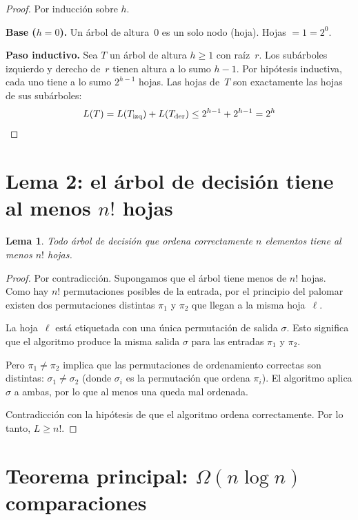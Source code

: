 \documentclass[11pt, letterpaper]{article}
\theoremstyle{definition}
\theoremstyle{plain}
\newtheorem{lemma}[theorem]{Lema}
\theoremstyle{remark}
\begin{document}
\begin{proof}
Por inducción sobre $h$.

\textbf{Base ($h = 0$).} Un árbol de altura~0 es un solo nodo (hoja).
Hojas $= 1 = 2^0$. \checkmark

\textbf{Paso inductivo.} Sea $T$ un árbol de altura $h \geq 1$ con
raíz~$r$. Los subárboles izquierdo y derecho de~$r$ tienen altura a lo
sumo $h - 1$. Por hipótesis inductiva, cada uno tiene a lo sumo
$2^{h-1}$ hojas. Las hojas de~$T$ son exactamente las hojas de sus
subárboles:
\[
  L(T) = L(T_{\text{izq}}) + L(T_{\text{der}})
  \leq 2^{h-1} + 2^{h-1} = 2^h \qedhere
\]
\end{proof}

\section{Lema 2: el árbol de decisión tiene al menos $n!$ hojas}

\begin{lemma}\label{lem:nfact}
Todo árbol de decisión que ordena correctamente $n$ elementos tiene al
menos $n!$ hojas.
\end{lemma}

\begin{proof}
Por contradicción. Supongamos que el árbol tiene menos de $n!$ hojas.
Como hay $n!$ permutaciones posibles de la entrada, por el principio
del palomar existen dos permutaciones distintas $\pi_1$ y $\pi_2$ que
llegan a la misma hoja~$\ell$.

La hoja~$\ell$ está etiquetada con una única permutación de salida
$\sigma$. Esto significa que el algoritmo produce la misma salida
$\sigma$ para las entradas $\pi_1$ y $\pi_2$.

Pero $\pi_1 \neq \pi_2$ implica que las permutaciones de ordenamiento
correctas son distintas: $\sigma_1 \neq \sigma_2$ (donde $\sigma_i$ es
la permutación que ordena $\pi_i$). El algoritmo aplica $\sigma$ a
ambas, por lo que al menos una queda mal ordenada.

Contradicción con la hipótesis de que el algoritmo ordena
correctamente. Por lo tanto, $L \geq n!$.
\end{proof}

\section{Teorema principal:
  \texorpdfstring{$\Omega(n \log n)$}{Omega(n log n)} comparaciones}
\end{document}
